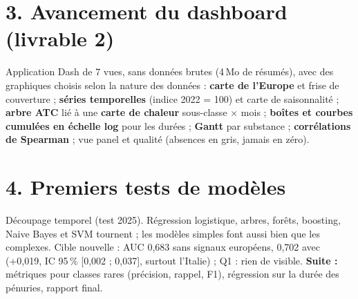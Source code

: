 \section{3. Avancement du dashboard (livrable 2)}
Application Dash de 7 vues, sans données brutes (4\,Mo de résumés), avec des graphiques choisis selon la nature des
données : \textbf{carte de l'Europe} et frise de couverture ; \textbf{séries temporelles} (indice 2022 = 100) et carte
de saisonnalité ; \textbf{arbre ATC} lié à une \textbf{carte de chaleur} sous-classe $\times$ mois ; \textbf{boîtes et
courbes cumulées en échelle log} pour les durées ; \textbf{Gantt} par substance ; \textbf{corrélations de Spearman} ;
vue panel et qualité (absences en gris, jamais en zéro).

\section{4. Premiers tests de modèles}
Découpage temporel (test 2025). Régression logistique, arbres, forêts, boosting, Naive Bayes et SVM tournent ; les
modèles simples font aussi bien que les complexes. Cible nouvelle : AUC 0,683 sans signaux européens, 0,702 avec
(+0,019, IC 95\,\% [0,002 ; 0,037], surtout l'Italie) ; Q1 : rien de visible. \textbf{Suite :} métriques pour classes rares
(précision, rappel, F1), régression sur la durée des pénuries, rapport final.

